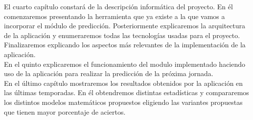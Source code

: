 El cuarto capítulo constará de la descripción informática del proyecto. En él comenzaremos presentando la herramienta que ya existe a la que vamos a incorporar el  módulo de predicción. Posteriormente explicaremos la arquitectura de la aplicación y enumeraremos todas las tecnologías usadas para el proyecto. Finalizaremos explicando los aspectos más relevantes de la implementación de la aplicación.\\

En el quinto explicaremos el funcionamiento del modulo implementado haciendo uso de la aplicación para realizar la predicción de la próxima jornada.\\

En el último capítulo mostraremos los resultados obtenidos por la aplicación en las últimas temporadas. En él obtendremos distintas estadísticas y compararemos los distintos modelos matemáticos propuestos eligiendo las variantes propuestas que tienen mayor porcentaje de aciertos.\\

